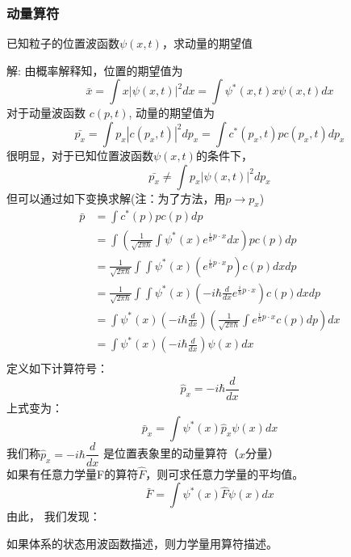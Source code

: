 \begin{frame} [allowframebreaks=]
    \frametitle{动量算符}
    \begin{exampleblock}{}
        已知粒子的位置波函数$\psi(x,t)$，求动量的期望值   
    \end{exampleblock}
    \alert{解:} 由概率解释知，位置的期望值为
    \begin{equation*}
        \bar{x}=\int x|\psi(x, t)|^{2} d x=\int \psi^{*}(x, t) x \psi(x, t) d x
    \end{equation*}
    对于动量波函数 $c(p,t)$, 动量的期望值为
    \begin{equation*}
        \bar{p_x}=\int p_x|c(p_x, t)|^{2} d p_x=\int c^{*}(p_x, t) p c(p_x, t) d p_x
    \end{equation*}
    很明显，对于已知位置波函数$\psi(x,t)$的条件下，
    \begin{equation*}
        \bar{p_x}\neq\int p_x|\psi(x, t)|^{2} d p_x
    \end{equation*}
    但可以通过如下变换求解(注：为了方法，用$p \to p_x$)
    \begin{equation*}
        \begin{split}
            \bar{p}&=\int c^{*}(p) p c(p) d p \\  
            &=\int (\frac{1}{\sqrt{2 \pi \hbar}} \int \psi^{*}(x) e^{\frac{i}{\hbar} p\cdot x} d x) p c\left(p\right) d p \\
            &=\frac{1}{\sqrt{2 \pi \hbar}} \int \int \psi^{*}(x) (e^{\frac{i}{\hbar} p\cdot x}  p) c\left(p\right) d xd p \\
            &=\frac{1}{\sqrt{2 \pi \hbar}} \int \int \psi^{*}(x) (-i\hbar\frac{d}{d x} e^{\frac{i}{\hbar} p\cdot x}) c(p) d xd p \\
            &=\int \psi^{*}(x) (-i\hbar\frac{d}{d x}) (\frac{1}{\sqrt{2 \pi \hbar}} \int e^{\frac{i}{\hbar} p\cdot x} c(p) d p)  d x\\
            &=\int \psi^{*}(x) (-i\hbar\frac{d}{d x}) \psi(x)  d x\\
         \end{split}
    \end{equation*}  
    定义如下计算符号：
    $$ \hat{p}_x= -i\hbar\frac{d}{d x} $$ 
    上式变为：         
    $$\bar{p}_x=\int \psi^{*}(x) \hat{p}_x \psi(x) d x $$
    我们称$ \hat{p}_x= -i\hbar\dfrac{d}{d x} $ 是位置表象里的动量算符（$x$分量）\\
    如果有任意力学量F的算符$\hat{F}$，则可求任意力学量的平均值。\\
    $$\bar{F}=\int \psi^{*}(x) \hat{F} \psi(x) d x $$
    由此， 我们发现：
    \begin{tcolorbox}[colback=yellow!10,colframe=red!75!black,title=Basic assumption 3/5]
    如果体系的状态用波函数描述，则力学量用算符描述。
    \end{tcolorbox}
\end{frame} 

